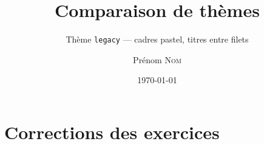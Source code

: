 \documentclass[11pt]{ocots-book}
\title{Comparaison de thèmes}
\subtitle{Thème \texttt{legacy} — cadres pastel, titres entre filets}
\author{Prénom \textsc{Nom}}
\date{\today}
\begin{document}
\maketitle

\ocotscollectsolutions%





\chapter{Corrections des exercices}
\ocotsprintsolutions%



\end{document}
